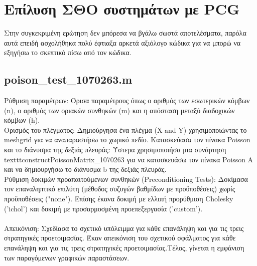 \documentclass[12pt,a4paper]{article}
\begin{document}
\section{Επίλυση ΣΘΟ συστημάτων με PCG}
Στην συγκεκριμένη ερώτηση δεν μπόρεσα να βγάλω σωστά αποτελέσματα, παρόλα αυτά επειδή ασχολήθηκα πολύ έφτιαξα αρκετά αξιόλογο κώδικα για να μπορώ να εξηγήσω το σκεπτικό πίσω από τον κώδικα.
\subsection{poison\_test\_1070263.m}
Ρύθμιση παραμέτρων: Όρισα παραμέτρους όπως ο αριθμός των εσωτερικών κόμβων (n), ο αριθμός των οριακών συνθηκών (m) και η απόσταση μεταξύ διαδοχικών κόμβων (h).\\
Ορισμός του πλέγματος: Δημιούργησα ένα πλέγμα (X and Y) χρησιμοποιώντας το meshgrid για να αναπαραστήσω το χωρικό πεδίο.
Κατασκεύασα τον πίνακα Poisson και το διάνυσμα της δεξιάς πλευράς: Ύστερα χρησιμοποιήσα μια συνάρτηση  texttt{constructPoissonMatrix\_1070263}  για να κατασκευάσω τον πίνακα Poisson A και να δημιουργήσω το διάνυσμα b της δεξιάς πλευράς.\\

Ρύθμιση δοκιμών προαπαιτούμενων συνθηκών (Preconditioning Tests):
Δοκίμασα τον επαναληπτικό επιλύτη (μέθοδος συζυγών βαθμίδων με προϋποθέσεις) χωρίς προϋποθέσεις ("none"). Επίσης έκανα δοκιμή με ελλιπή προρύθμιση  Cholesky ('ichol') και δοκιμή με προσαρμοσμένη προεπεξεργασία ('custom').\\
\\
Απεικόνιση:
Σχεδίασα το σχετικό υπόλειμμα για κάθε επανάληψη και για τις τρεις στρατηγικές προετοιμασίας. Έκαν απεικόνιση του σχετικού σφάλματος για κάθε επανάληψη και για τις τρεις στρατηγικές προετοιμασίας.Τέλος, γίνεται η εμφάνιση των παραγόμενων γραφικών παραστάσεων.
\end{document}
